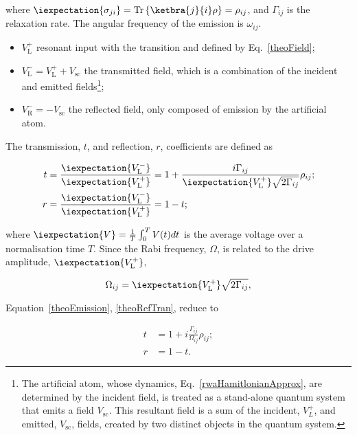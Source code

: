 \noindent where $ \iexpectation{\sigma_{ji}}=\text{Tr}\left\lbrace \ketbra{j}{i}\rho \right\rbrace = \rho_{ij} $, and $ \Gamma_{ij} $ is the \lra{} relaxation rate. The angular frequency of the emission is $ \omega_{ij} $.
\begin{itemize}
	\item $ V_{\text{L}}^{+} $ resonant input with the \lra{} transition and defined by Eq.~\eqref{theoField};
	\item $ V_{\text{L}}^{-} = V_{\text{L}}^{+}+V_{\text{sc}}$ the transmitted field, which is a combination of the incident and emitted fields\footnote{The artificial atom, whose dynamics, Eq.~\eqref{rwaHamitlonianApprox}, are determined by the incident field, is treated as a stand-alone quantum system that emits a field $ V_{\text{sc}} $. This resultant field is a sum of the incident, $V_{L}^{+} $, and emitted, $ V_{\text{sc}} $, fields, created by two distinct objects in the quantum system.};
	\item $ V_{\text{R}}^{-} = - V_{\text{sc}}$ the reflected field, only composed of emission by the artificial atom.
\end{itemize}

The transmission, $ t $, and reflection, $ r $, coefficients are defined as

\begin{equation}\label{theoRefTran}
\begin{aligned}
t & = \frac{\iexpectation{V_{\text{L}}^{-}}}{\iexpectation{V_{\text{L}}^{+}}} = 1+\frac{i\Gamma_{ij}}{\iexpectation{V_{\text{L}}^{+}}\sqrt{2\Gamma_{ij}}}\rho_{ij};\\
r & = \frac{\iexpectation{V_{\text{L}}^{-}}}{\iexpectation{V_{\text{L}}^{+}}} = 1-t;
\end{aligned}
\end{equation}

\noindent where $\iexpectation{V} = \frac{1}{T}\int_{0}^{T}V(t)dt$ is the average voltage over a normalisation time $ T $. Since the Rabi frequency, $ \Omega $, is related to the drive amplitude, $ \iexpectation{V_{\text{L}}^{+}}  $,

\begin{equation}
\Omega_{ij}=\iexpectation{V_{\text{L}}^{+}}\sqrt{2\Gamma_{ij}},
\end{equation}

\noindent Equation~\eqref{theoEmission}, \eqref{theoRefTran}, reduce to

\begin{equation}\label{theoCoeff}
\begin{aligned}
t & = 1 + i\frac{\Gamma_{ij}}{\Omega_{ij}}\rho_{ij};\\
r & = 1-t.
\end{aligned}
\end{equation}


